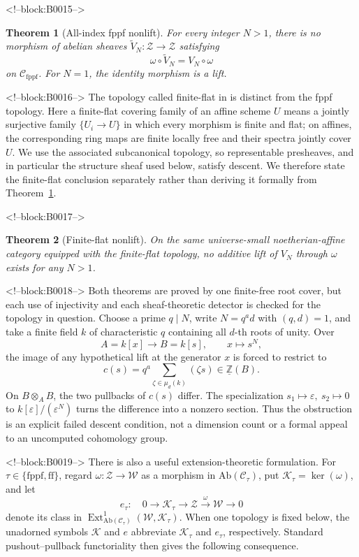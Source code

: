 \documentclass[11pt]{article}
\newtheorem{theorem}{Theorem}[section]
\theoremstyle{definition}
\newcommand{\Ext}{\operatorname{Ext}}
\newcommand{\Zpre}{\underline{\mathbb Z}}
\newcommand{\Zsh}{\mathcal Z}
\newcommand{\Wsh}{\mathcal W}
\newcommand{\Ksh}{\mathcal K}
\newcommand{\ff}{\mathrm{ff}}
\newcommand{\fppf}{\mathrm{fppf}}
\begin{document}
<!--block:B0015-->
\begin{theorem}[All-index fppf nonlift]\label{thm:fppf}
For every integer \(N>1\), there is no morphism of abelian sheaves
\(\widetilde V_N\colon\Zsh\to\Zsh\) satisfying
\[
 \omega\circ\widetilde V_N=V_N\circ\omega
\]
on \(\mathscr C_{\fppf}\).  For \(N=1\), the identity morphism is a lift.
\end{theorem}

<!--block:B0016-->
The topology called finite-flat in
\cite[Sec.~4]{Deninger2025Rational} is distinct from the fppf topology.
Here a finite-flat covering family of an affine scheme \(U\) means a
jointly surjective family \(\{U_i\to U\}\) in which every morphism is finite
and flat; on affines, the corresponding ring maps are finite locally free
and their spectra jointly cover \(U\).  We use the associated subcanonical
topology, so representable presheaves, and in particular the structure
sheaf used below, satisfy descent.  We therefore state the finite-flat
conclusion separately rather than deriving it formally from
Theorem~\ref{thm:fppf}.

<!--block:B0017-->
\begin{theorem}[Finite-flat nonlift]\label{thm:ff}
On the same universe-small noetherian-affine category equipped with the
finite-flat topology, no additive lift of \(V_N\) through \(\omega\) exists
for any \(N>1\).
\end{theorem}

<!--block:B0018-->
Both theorems are proved by one finite-free root cover, but each use of
injectivity and each sheaf-theoretic detector is checked for the topology
in question.  Choose a prime \(q\mid N\), write \(N=q^a d\) with
\((q,d)=1\), and take a finite field \(k\) of characteristic \(q\)
containing all \(d\)-th roots of unity.  Over
\[
 A=k[x]\longrightarrow B=k[s],\qquad x\longmapsto s^N,
\]
the image of any hypothetical lift at the generator \(x\) is forced to
restrict to
\[
 c(s)=q^a\sum_{\zeta\in\mu_d(k)}(\zeta s)\in\Zpre(B).
\]
On \(B\otimes_A B\), the two pullbacks of \(c(s)\) differ.  The
specialization \(s_1\mapsto\varepsilon,\ s_2\mapsto0\) to
\(k[\varepsilon]/(\varepsilon^N)\) turns the difference into a nonzero
section.  Thus the obstruction is an explicit failed descent condition,
not a dimension count or a formal appeal to an uncomputed cohomology
group.

<!--block:B0019-->
There is also a useful extension-theoretic formulation.  For
\(\tau\in\{\fppf,\ff\}\), regard \(\omega\colon\Zsh\to\Wsh\) as a morphism
in \(\mathrm{Ab}(\mathscr C_\tau)\), put
\(\Ksh_\tau=\ker(\omega)\), and let
\[
 e_\tau:\quad 0\longrightarrow\Ksh_\tau\longrightarrow\Zsh
 \xrightarrow{\omega}\Wsh\longrightarrow0
 \tag{1.1}\label{eq:extension}
\]
denote its class in
\(\Ext^1_{\mathrm{Ab}(\mathscr C_\tau)}(\Wsh,\Ksh_\tau)\).
When one topology is fixed below, the unadorned symbols \(\Ksh\) and \(e\)
abbreviate \(\Ksh_\tau\) and \(e_\tau\), respectively.  Standard
pushout--pullback functoriality then gives the following consequence.
\end{document}
